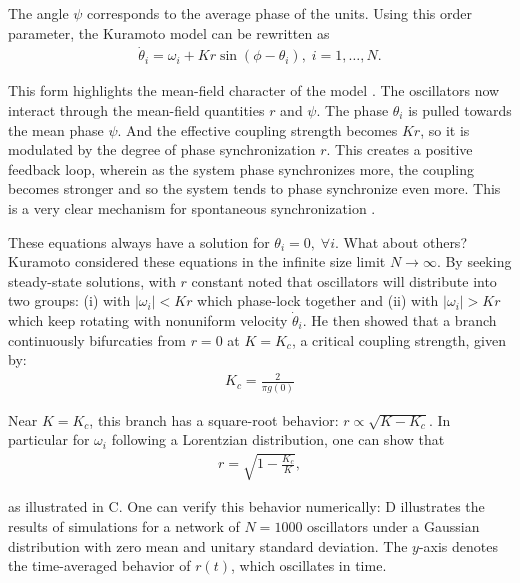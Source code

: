 The angle $\psi$ corresponds to the average phase of the units. Using this order parameter, the Kuramoto model can be rewritten as
\begin{align}
    \dot{\theta}_i = \omega_i + Kr\sin(\phi - \theta_i), \; i=1,\ldots,N.
\end{align} 

This form highlights the mean-field character of the model \cite{strogatz2000from}. The oscillators now interact through the mean-field quantities $r$ and $\psi$. The phase $\theta_i$ is pulled towards the mean phase $\psi$. And the effective coupling strength becomes $Kr$, so it is modulated by the degree of phase synchronization $r$. This creates a positive feedback loop, wherein as the system phase synchronizes more, the coupling becomes stronger and so the system tends to phase synchronize even more. This is a very clear mechanism for spontaneous synchronization \cite{strogatz2000from}. 


These equations always have a solution for $\theta_i = 0, \; \forall i$. What about others? Kuramoto considered these equations in the infinite size limit $N\to\infty$. By seeking steady-state solutions, with $r$ constant noted that oscillators will distribute into two groups: (i) with $|\omega_i| < Kr$ which phase-lock together and (ii) with $|\omega_i| > Kr$ which keep rotating with nonuniform velocity $\dot{\theta}_i$.  He then showed that a branch continuously bifurcaties from $r=0$ at $K=K_c$, a critical coupling strength, given by:
%
\begin{align}
    K_c = \frac{2}{\pi g(0)}
\end{align}

Near $K=K_c$, this branch has a square-root behavior: $r \propto \sqrt{K-K_c}$. In particular for $\omega_i$ following a Lorentzian distribution, one can show that \cite{kuramoto1984chemical, strogatz2000from}
\begin{align}
    r = \sqrt{1 - \frac{K_c}{K}},
    \label{eq:kuramoto-lorentzian}
\end{align}

as illustrated in C. One can verify this behavior numerically: D illustrates the results of simulations for a network of $N=1000$ oscillators under a Gaussian distribution with zero mean and unitary standard deviation. The $y$-axis denotes the time-averaged behavior of $r(t)$, which oscillates in time.

